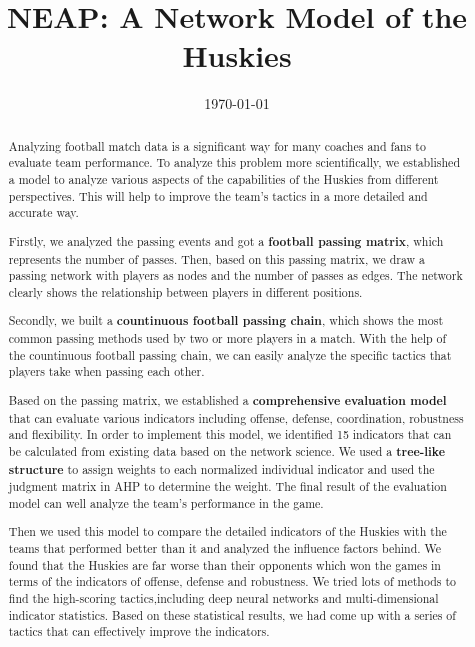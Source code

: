 \documentclass{mcmthesis}
\begin{document}
\linespread{0.6} %
\setlength{\parskip}{0.5\baselineskip} %
\title{NEAP: A Network Model of the Huskies}

\date{\today}
\begin{abstract}
\par Analyzing football match data is a significant way for many coaches and fans to evaluate team performance. To analyze this problem more scientifically, we established a model to analyze various aspects of the capabilities of the Huskies from different perspectives. This will help to improve the team's tactics in a more detailed and accurate way.\par

Firstly, we analyzed the passing events and got a \textbf{football passing matrix}, which represents the number of passes. Then, based on this passing matrix, we draw a passing network with players as nodes and the number of passes as edges. The network clearly shows the relationship between players in different positions.\par

Secondly, we built a \textbf{countinuous football passing chain}, which shows the most common passing methods used by two or more players in a match. With the help of the countinuous football passing chain, we can easily analyze the specific tactics that players take when passing each other.\par

Based on the passing matrix, we established a \textbf{comprehensive evaluation model} that can evaluate various indicators including offense, defense, coordination, robustness and flexibility. In order to implement this model, we identified 15 indicators that can be calculated from existing data based on the network science. We used a \textbf{tree-like structure} to assign weights to each normalized individual indicator and used the judgment matrix in AHP to determine the weight. The final result of the evaluation model can well analyze the team's performance in the game.\par

Then we used this model to compare the detailed indicators of the Huskies with the teams that performed better than it and analyzed the influence factors behind. We found that the Huskies are far worse than their opponents which won the games in terms of the indicators of offense, defense and robustness. We tried lots of methods to find the high-scoring tactics,including deep neural networks and multi-dimensional indicator statistics. Based on these statistical results, we had come up with a series of tactics that can effectively improve the indicators.


\end{abstract}
\end{document}
